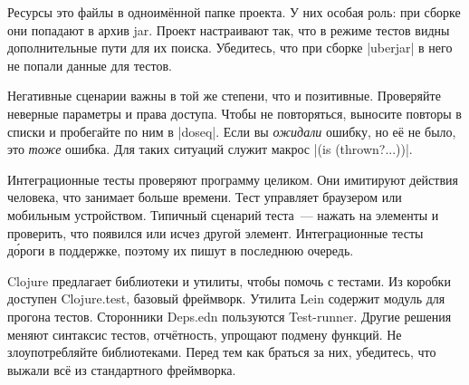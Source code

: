 Ресурсы это файлы в одноим\"{е}нной папке проекта. У них особая роль: при сборке они
попадают в архив jar. Проект настраивают так, что в режиме тестов видны
дополнительные пути для их поиска. Убедитесь, что при сборке \spverb|uberjar| в
него не попали данные для тестов.

Негативные сценарии важны в той же степени, что и позитивные. Проверяйте
неверные параметры и права доступа. Чтобы не повторяться, выносите повторы в
списки и пробегайте по ним в \spverb|doseq|. Если вы \emph{ожидали} ошибку, но
е\"{е} не было, это \emph{тоже} ошибка. Для таких ситуаций служит
макрос \spverb|(is (thrown?...))|.

Интеграционные тесты проверяют программу целиком. Они имитируют действия
человека, что занимает больше времени. Тест управляет браузером или мобильным
устройством. Типичный сценарий теста~--- нажать на элементы и проверить, что
появился или исчез другой элемент. Интеграционные тесты д\'{о}роги в поддержке,
поэтому их пишут в последнюю очередь.

Clojure предлагает библиотеки и утилиты, чтобы помочь с тестами. Из коробки
доступен Clojure.test, базовый фреймворк. Утилита Lein содержит модуль для
прогона тестов. Сторонники Deps.edn пользуются Test-runner. Другие решения
меняют синтаксис тестов, отч\"{е}тность, упрощают подмену функций. Не
злоупотребляйте библиотеками. Перед тем как браться за них, убедитесь, что
выжали вс\"{е} из стандартного фреймворка.
